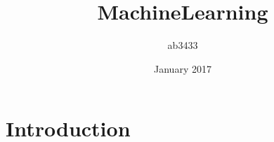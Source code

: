 \documentclass{article}
\title{MachineLearning}
\author{ab3433 }
\date{January 2017}
\begin{document}
\maketitle

\section{Introduction}
\end{document}
